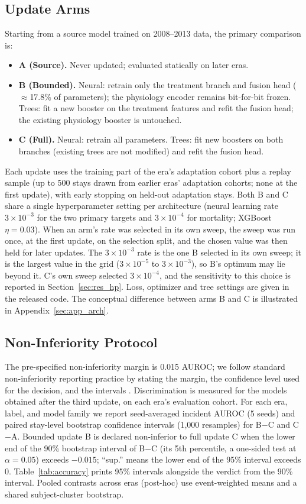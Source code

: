 \documentclass[10pt,a4paper,twocolumn]{article}
\begin{document}
	\subsection{Update Arms}
	Starting from a source model trained on 2008--2013 data, the primary comparison is:
	\begin{itemize}\setlength{\itemsep}{1pt}
		\item \textbf{A (Source).} Never updated; evaluated statically on later eras.
		\item \textbf{B (Bounded).} Neural: retrain only the treatment branch and fusion head ($\approx$17.8\% of parameters); the physiology encoder remains bit-for-bit frozen. Trees: fit a new booster on the treatment features and refit the fusion head; the existing physiology booster is untouched.
		\item \textbf{C (Full).} Neural: retrain all parameters. Trees: fit new boosters on both branches (existing trees are not modified) and refit the fusion head.
	\end{itemize}
	Each update uses the training part of the era's adaptation cohort plus a replay sample (up to 500 stays drawn from earlier eras' adaptation cohorts; none at the first update), with early stopping on held-out adaptation stays. Both B and C share a single hyperparameter setting per architecture (neural learning rate $3\times10^{-3}$ for the two primary targets and $3\times10^{-4}$ for mortality; XGBoost $\eta = 0.03$). When an arm's rate was selected in its own sweep, the sweep was run once, at the first update, on the selection split, and the chosen value was then held for later updates. The $3\times10^{-3}$ rate is the one B selected in its own sweep; it is the largest value in the grid ($3\times10^{-5}$ to $3\times10^{-3}$), so B's optimum may lie beyond it. C's own sweep selected $3\times10^{-4}$, and the sensitivity to this choice is reported in Section~\ref{sec:res_hp}. Loss, optimizer and tree settings are given in the released code. The conceptual difference between arms B and C is illustrated in Appendix~\ref{sec:app_arch}.
	
	\subsection{Non-Inferiority Protocol}
	\label{sec:ni}
	The pre-specified non-inferiority margin is 0.015 AUROC; we follow standard non-inferiority reporting practice by stating the margin, the confidence level used for the decision, and the intervals \citep{piaggio2012reporting}. Discrimination is measured for the models obtained after the third update, on each era's evaluation cohort. For each era, label, and model family we report seed-averaged incident AUROC (5 seeds) and paired stay-level bootstrap confidence intervals (1,000 resamples) for B$-$C and C$-$A. Bounded update B is declared non-inferior to full update C when the lower end of the 90\% bootstrap interval of B$-$C (its 5th percentile, a one-sided test at $\alpha = 0.05$) exceeds $-0.015$; ``sup.'' means the lower end of the 95\% interval exceeds 0. Table~\ref{tab:accuracy} prints 95\% intervals alongside the verdict from the 90\% interval. Pooled contrasts across eras (post-hoc) use event-weighted means and a shared subject-cluster bootstrap.
	
\end{document}
